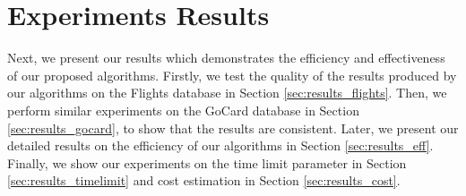 \section{Experiments Results}
%
Next, we present our results which demonstrates the efficiency and effectiveness of our proposed algorithms.
%
Firstly, we test the quality of the results produced by our algorithms on the Flights database in Section \ref{sec:results_flights}.
%
Then, we perform similar experiments on the GoCard database in Section \ref{sec:results_gocard}, to show that the results are consistent.
%
Later, we present our detailed results on the efficiency of our algorithms in Section \ref{sec:results_eff}.
%
Finally, we show our experiments on the time limit parameter in Section \ref{sec:results_timelimit} and cost estimation in Section \ref{sec:results_cost}.
%
%
%





%